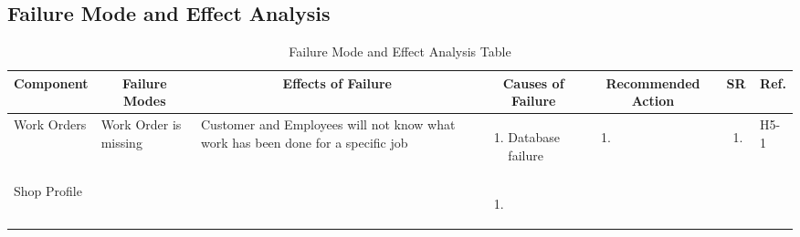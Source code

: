 \documentclass{article}
\begin{document}
\newpage
\begin{landscape}
	\section{Failure Mode and Effect Analysis}
	\begin{table}[H]
		\centering
		\caption{Failure Mode and Effect Analysis Table}
		\begin{adjustbox}{width=\paperwidth}
			\begin{tabular}{|p{0.15\textwidth}|p{}|p{0.25\textwidth}|p{}|p{}|p{}|p{}|}
				\hline
				\multicolumn{1}{|c|}{\textbf{Component}}
				               & \multicolumn{1}{|c|}{\textbf{Failure Modes}}
				               & \multicolumn{1}{|c|}{\textbf{Effects of Failure}}
				               & \multicolumn{1}{|c|}{\textbf{Causes of Failure}}
				               & \multicolumn{1}{|c|}{\textbf{Recommended Action}}
				               & \multicolumn{1}{|c|}{\textbf{SR}}
				               & \multicolumn{1}{|c|}{\textbf{Ref.}}                                             \\
				\hline
				Work Orders
				               & Work Order is missing
				               & Customer and Employees will not know what work has been done for a specific job
				               & \begin{enumerate}[label=\alph*., leftmargin=*]
					                 \item Database failure
				                 \end{enumerate}
				               & \begin{enumerate}[label=\alph*., leftmargin=*]
					                 \item
				                 \end{enumerate}
				               & \begin{enumerate}[label=\alph*., leftmargin=*]
					                 \item
				                 \end{enumerate}
				               & H5-1                                                                            \\
				\hline
				Shop Profile
				               & ~
				               & ~
				               & \begin{enumerate}[label=\alph*., leftmargin=*]
					                 \item
				                 \end{enumerate}

\end{tabular}
\end{adjustbox}
\end{table}
\end{landscape}
\end{document}
